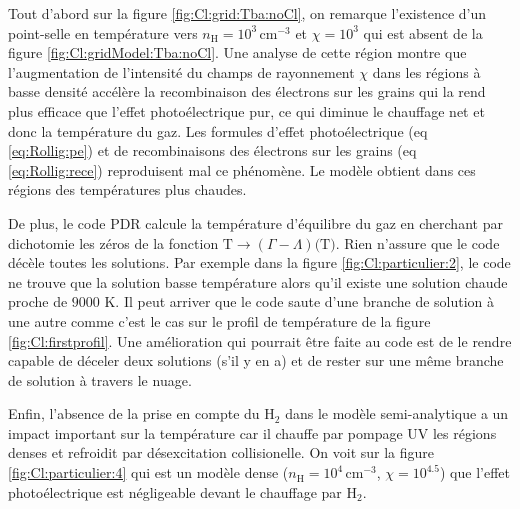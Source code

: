 Tout d'abord sur la figure \ref{fig:Cl:grid:Tba:noCl}, on remarque l'existence d'un point-selle en température vers $n_\mathrm{H}=10^3 \, \mathrm{cm}^{-3}$ et $\chi=10^3$ qui est absent de la figure \ref{fig:Cl:gridModel:Tba:noCl}. Une analyse de cette région montre que l'augmentation de l'intensité du champs de rayonnement $\chi$ dans les régions à basse densité accélère la recombinaison des électrons sur les grains qui la rend plus efficace que l'effet photoélectrique pur, ce qui diminue le chauffage net et donc la température du gaz. Les formules d'effet photoélectrique (eq \ref{eq:Rollig:pe}) et de recombinaisons des électrons sur les grains (eq \ref{eq:Rollig:rece}) reproduisent mal ce phénomène. Le modèle obtient dans ces régions des températures plus chaudes. \newline 

De plus, le code PDR calcule la température d'équilibre du gaz en cherchant par dichotomie les zéros de la fonction $\mathrm{T} \rightarrow (\Gamma - \Lambda)(\mathrm{T)}$. Rien n'assure que le code décèle toutes les solutions. Par exemple dans la figure \ref{fig:Cl:particulier:2}, le code ne trouve que la solution basse température alors qu'il existe une solution chaude proche de $9000$ K. Il peut arriver que le code saute d'une branche de solution à une autre comme c'est le cas sur le profil de température de la figure \ref{fig:Cl:firstprofil}. Une amélioration qui pourrait être faite au code est de le rendre capable de déceler deux solutions (s'il y en a) et de rester sur une même branche de solution à travers le nuage. \newline 

Enfin, l'absence de la prise en compte du $\mathrm{H}_2$ dans le modèle semi-analytique a un impact important sur la température car il chauffe par pompage UV les régions denses et refroidit par désexcitation collisionelle. On voit sur la figure \ref{fig:Cl:particulier:4} qui est un modèle dense ($n_\mathrm{H}=10^4 \, \mathrm{cm}^{-3}$, $\chi=10^{4.5}$) que l'effet photoélectrique est négligeable devant le chauffage par $\mathrm{H}_2$. 


